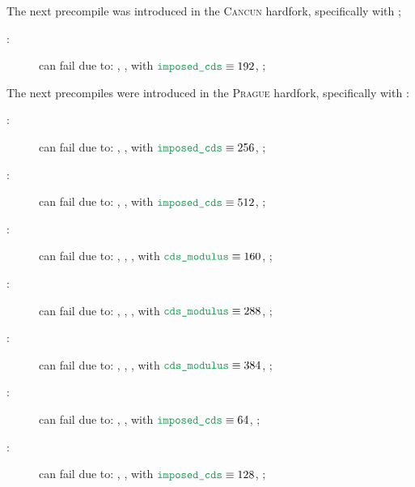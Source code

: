 \noindent The next precompile was introduced in the \textsc{Cancun} hardfork, specifically with \cite{EIP-4844};
\begin{description}
	\item[\instPointEvaluation:]
		can fail due to:
		\locBlsPrecompileFailureReasonGas,
		\locBlsPrecompileFailureReasonSize, with $\locImposedCallDataSizeForBlsPrecompiles \equiv 192$,
		\locBlsPrecompileFailureReasonData;
\end{description}
The next precompiles were introduced in the \textsc{Prague} hardfork, specifically with \cite{EIP-2537}:
\begin{description}
	\item[\instBlsGOneAdd{}:]
		can fail due to:
		\locBlsPrecompileFailureReasonGas,
		\locBlsPrecompileFailureReasonSize, with $\locImposedCallDataSizeForBlsPrecompiles \equiv 256$,
		\locBlsPrecompileFailureReasonData;
	\item[\instBlsGTwoAdd{}:]
		can fail due to:
		\locBlsPrecompileFailureReasonGas,
		\locBlsPrecompileFailureReasonSize, with $\locImposedCallDataSizeForBlsPrecompiles \equiv 512$,
		\locBlsPrecompileFailureReasonData;
	\item[\instBlsGOneMsm{}:]
		can fail due to:
		\locBlsPrecompileFailureReasonGas,
		\locBlsPrecompileFailureReasonEmpty,
		\locBlsPrecompileFailureReasonMod, with $\locCallDataSizeModulusForBlsPrecompiles \equiv 160$,
		\locBlsPrecompileFailureReasonData;
	\item[\instBlsGTwoMsm{}:]
		can fail due to:
		\locBlsPrecompileFailureReasonGas,
		\locBlsPrecompileFailureReasonEmpty,
		\locBlsPrecompileFailureReasonMod, with $\locCallDataSizeModulusForBlsPrecompiles \equiv 288$,
		\locBlsPrecompileFailureReasonData;
	\item[\instBlsPairingCheck{}:]
		can fail due to:
		\locBlsPrecompileFailureReasonGas,
		\locBlsPrecompileFailureReasonEmpty,
		\locBlsPrecompileFailureReasonMod, with $\locCallDataSizeModulusForBlsPrecompiles \equiv 384$,
		\locBlsPrecompileFailureReasonData;
	\item[\instBlsMapFpToGOne{}:]
		can fail due to:
		\locBlsPrecompileFailureReasonGas,
		\locBlsPrecompileFailureReasonSize, with $\locImposedCallDataSizeForBlsPrecompiles \equiv 64$,
		\locBlsPrecompileFailureReasonData;
	\item[\instBlsMapFpTwoToGTwo{}:]
		can fail due to:
		\locBlsPrecompileFailureReasonGas,
		\locBlsPrecompileFailureReasonSize, with $\locImposedCallDataSizeForBlsPrecompiles \equiv 128$,
		\locBlsPrecompileFailureReasonData;
\end{description}

